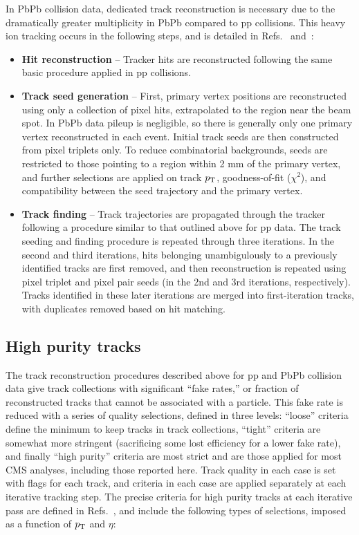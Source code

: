 In PbPb collision data, dedicated track reconstruction is necessary due to the dramatically greater multiplicity in PbPb compared to pp collisions.  This heavy ion tracking occurs in the following steps, and is detailed in Refs.~\cite{AN_2014_024} and~\cite{AN-15-187}: 
\begin{itemize}

\item \textbf{Hit reconstruction} -- Tracker hits are reconstructed following the same basic procedure applied in pp collisions.

\item \textbf{Track seed generation} -- First, primary vertex positions are reconstructed using only a collection of pixel hits, extrapolated to the region near the beam spot.  In PbPb data pileup is negligible, so there is generally only one primary vertex reconstructed in each event.  Initial track seeds are then constructed from pixel triplets only.  To reduce combinatorial backgrounds, seeds are restricted to those pointing to a region within 2 mm of the primary vertex, and further selections are applied on track $p_{\rm T}$, goodness-of-fit ($\chi^{2}$), and compatibility between the seed trajectory and the primary vertex.  

\item \textbf{Track finding} -- Track trajectories are propagated through the tracker following a procedure similar to that outlined above for pp data.  The track seeding and finding procedure is repeated through three iterations.  In the second and third iterations, hits belonging unambigulously to a previously identified tracks are first removed, and then reconstruction is repeated using pixel triplet and pixel pair seeds (in the 2nd and 3rd iterations, respectively).  Tracks identified in these later iterations are merged into first-iteration tracks, with duplicates removed based on hit matching.

\end{itemize}

\subsection{High purity tracks}
\label{sec:high_purity}

The track reconstruction procedures described above for pp and PbPb collision data give track collections with significant ``fake rates,'' or fraction of reconstructed tracks that cannot be associated with a particle.  This fake rate is reduced with a series of quality selections, defined in three levels:  ``loose'' criteria define the minimum to keep tracks in track collections, ``tight'' criteria are somewhat more stringent (sacrificing some lost efficiency for a lower fake rate), and finally ``high purity'' criteria are most strict and are those applied for most CMS analyses, including those reported here.  Track quality in each case is set with flags for each track, and criteria in each case are applied separately at each iterative tracking step.  The precise criteria for high purity tracks at each iterative pass are defined in Refs.~\cite{Chatrchyan:2014fea, AN_2014_024, AN-15-187}, and include the following types of selections, imposed as a function of $p_{\rm T}$ and $\eta$: 

